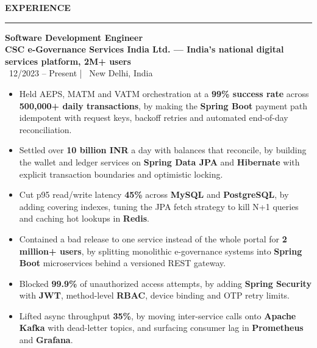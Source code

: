 \documentclass[10pt]{article}
\newcommand{\resumesection}[1]{%
  \vspace{6pt}%
  {\fontfamily{phv}\selectfont\textbf{\large\MakeUppercase{#1}}}%
  \vspace{2pt}%
  \hrule%
  \vspace{4pt}%
}
\begin{document}
\resumesection{Experience}
{\textbf{Software Development Engineer}} \\
{\textbf{\textcolor{primaryblue}{CSC e-Governance Services India Ltd. --- India's national digital services platform, 2M+ users}}} \\
{\footnotesize\textcolor{primaryblue}{\faCalendar*}~12/2023 -- Present \quad | \quad \textcolor{primaryblue}{\faMapMarker*}~New Delhi, India}
\begin{itemize}
    \item Held AEPS, MATM and VATM orchestration at a \textbf{99\% success rate} across \textbf{500,000+ daily transactions}, by making the \textbf{Spring Boot} payment path idempotent with request keys, backoff retries and automated end-of-day reconciliation.
    \item Settled over \textbf{10 billion INR} a day with balances that reconcile, by building the wallet and ledger services on \textbf{Spring Data JPA} and \textbf{Hibernate} with explicit transaction boundaries and optimistic locking.
    \item Cut p95 read/write latency \textbf{45\%} across \textbf{MySQL} and \textbf{PostgreSQL}, by adding covering indexes, tuning the JPA fetch strategy to kill N+1 queries and caching hot lookups in \textbf{Redis}.
    \item Contained a bad release to one service instead of the whole portal for \textbf{2 million+ users}, by splitting monolithic e-governance systems into \textbf{Spring Boot} microservices behind a versioned REST gateway.
    \item Blocked \textbf{99.9\%} of unauthorized access attempts, by adding \textbf{Spring Security} with \textbf{JWT}, method-level \textbf{RBAC}, device binding and OTP retry limits.
    \item Lifted async throughput \textbf{35\%}, by moving inter-service calls onto \textbf{Apache Kafka} with dead-letter topics, and surfacing consumer lag in \textbf{Prometheus} and \textbf{Grafana}.
\end{itemize}
\end{document}
